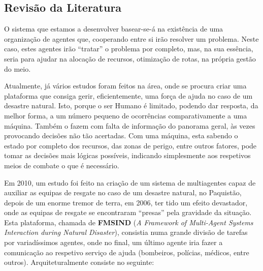 \documentclass[a4paper]{article}
\begin{document}
\subsection{Revisão da Literatura}
O sistema que estamos a desenvolver basear-se-á na existência de uma organização de agentes que, cooperando entre si irão resolver um problema. Neste caso, estes agentes irão “tratar” o problema por completo, mas, na sua essência, seria para ajudar na alocação de recursos, otimização de rotas, na própria gestão do meio. 

Atualmente, já vários estudos foram feitos na área, onde se procura criar uma plataforma que consiga gerir, eficientemente, uma força de ajuda no caso de um desastre natural. Isto, porque o ser Humano é limitado, podendo dar resposta, da melhor forma, a um número pequeno de ocorrências comparativamente a uma máquina. Também o fazem com falta de informação do panorama geral, às vezes provocando decisões não tão acertadas. Com uma máquina, esta sabendo o estado por completo dos recursos, das zonas de perigo, entre outros fatores, pode tomar as decisões mais lógicas possíveis, indicando simplesmente aos respetivos meios de combate o que é necessário.

Em 2010, um estudo foi feito na criação de um sistema de multiagentes capaz de auxiliar as equipas de resgate no caso de um desastre natural, no Paquistão, depois de um enorme tremor de terra, em 2006, ter tido um efeito devastador, onde as equipas de resgate se encontraram “presas” pela gravidade da situação. Esta plataforma, chamada de \textbf{FMSIND}\cite{fmsind} (\textit{A Framework of Multi-Agent Systems Interaction during Natural Disaster}), consistia numa grande divisão de tarefas por variadíssimos agentes, onde no final, um último agente iria fazer a comunicação ao respetivo serviço de ajuda (bombeiros, polícias, médicos, entre outros). Arquiteturalmente consiste no seguinte:
\end{document}
